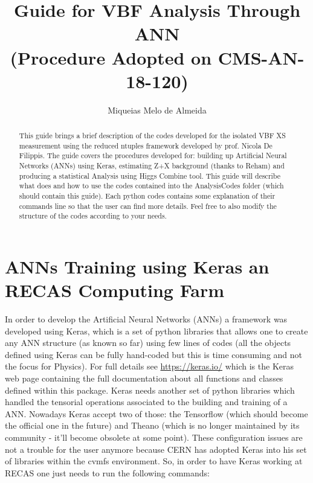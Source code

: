 \documentclass[]{report}
\title{\textbf{Guide for VBF Analysis Through ANN}\\
	(Procedure Adopted on CMS-AN-18-120)}
\author{Miqueias Melo de Almeida}
\begin{document}
\maketitle

\begin{abstract}
This guide brings a brief description of the codes developed for the isolated VBF XS measurement using the reduced ntuples framework developed by prof. Nicola De Filippis. The guide covers the procedures developed for: building up Artificial Neural Networks (ANNs) using Keras, estimating Z+X background (thanks to Reham) and producing a statistical Analysis using Higgs Combine tool. This guide will describe what does and how to use the codes contained into the AnalysisCodes folder (which should contain this guide). Each python codes contains some explanation of their commands line so that the user can find more details. Feel free to also modify the structure of the codes according to your needs.
\end{abstract}

\section{ANNs Training using Keras an RECAS Computing Farm}
In order to develop the Artificial Neural Networks (ANNs) a framework was developed using Keras, which is a set of python libraries that allows one to create any ANN structure (as known so far) using few lines of codes (all the objects defined using Keras can be fully hand-coded but this is time consuming and not the focus for Physics). For full details see \url{https://keras.io/} which is the Keras web page containing the full documentation about all functions and classes defined within this package. Keras needs another set of python libraries which handled the tensorial operations associated to the building and training of a ANN. Nowadays Keras accept two of those: the Tensorflow (which should become the official one in the future) and Theano (which is no longer maintained by its community - it'll become obsolete at some point). These configuration issues are not a trouble for the user anymore because CERN has adopted Keras into his set of libraries within the cvmfs environment. So, in order to have Keras working at RECAS one just needs to run the following commands:
\end{document}
